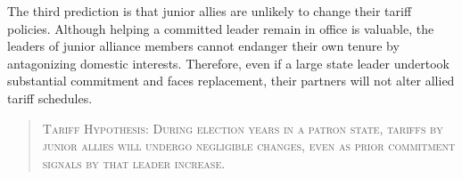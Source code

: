 \documentclass[12pt]{article}
\begin{document}
The third prediction is that junior allies are unlikely to change their tariff policies. 
Although helping a committed leader remain in office is valuable, the leaders of junior alliance members cannot endanger their own tenure by antagonizing domestic interests.
Therefore, even if a large state leader undertook substantial commitment and faces replacement, their partners will not alter allied tariff schedules. 


\begin{quote}
\textsc{Tariff Hypothesis: During election years in a patron state, tariffs by junior allies will undergo negligible changes, even as prior commitment signals by that leader increase.}
\end{quote}



%
%
%
%
\end{document}
